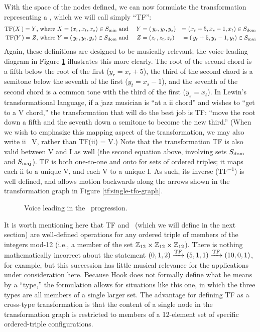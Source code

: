 With the space of the nodes defined, we can now formulate the transformation
representing a \tf, which we will call simply ``TF'':
%
{\novspace%
\begin{alignat*}{3}
    \mathrm{TF}(X\,) = Y\text{, where}\ X = (x_r, x_t, x_s) \in S_{\mathrm{min}}
    & \text{ and}\ &
    Y &= (\,y_r, y_t, y_s) &= (x_r + 5, x_s - 1, x_t) \in S_{\mathrm{dom}} \\
    \mathrm{TF}(Y\,) = Z\text{, where}\ Y = (\,y_r, y_t, y_s) \in S_{\mathrm{dom}}
    & \text{ and} &
    Z &= (z_r, z_t, z_s) &= (\,y_r + 5, y_s - 1, y_t) \in S_{\mathrm{maj}}
\end{alignat*}}%
%
Again, these definitions are designed to be musically relevant; the
voice-leading diagram in Figure \ref{tf:tfo-voice-leading} illustrates this
more clearly. The root of the second chord is a fifth below the root of the
first ($y_r = x_r + 5$), the third of the second chord is a semitone below the
seventh of the first ($y_t = x_s - 1$), and the seventh of the second chord is
a common tone with the third of the first ($y_s = x_t$). In Lewin's
transformational language, if a jazz musician is ``at a ii chord'' and
wishes to ``get to a V chord,'' the transformation that will do the
best job is TF: ``move the root down a fifth and the seventh down a semitone
to become the new third.'' (When we wish to emphasize this mapping
aspect of the transformation, we may also write ii
\TFarrow\ V, rather than TF(ii) = V.)
Note that the transformation TF is also valid
between V and I as well (the second equation above,
involving sets $S_{\mathrm{dom}}$ and $S_{\mathrm{maj}}$). TF is both one-to-one and onto for sets of
ordered triples; it maps each ii to a unique V, and each
V to a unique I. As such, its inverse ($\mathrm{TF}^{-1}$) is
well defined, and allows motion backwards along the arrows shown in the
transformation graph in Figure \ref{tf:single-tfo-graph}.

\begin{figure}[htbp]
  \caption{Voice leading in the \tfo\ progression.}
  \label{tf:tfo-voice-leading}
\end{figure}

It is worth mentioning here that TF and \tft\ (which we will define in the
next section) are well-defined operations for any ordered triple of members of
the integers mod-12 (i.e., a member of the set $\mathbb{Z}_{12} \times \mathbb{Z}_{12}
\times \mathbb{Z}_{12}$). There is nothing mathematically incorrect
about the statement $(0, 1, 2) \xrightarrow{\mathrm{TF}} (5, 1, 1) \xrightarrow{\mathrm{TF}} (10, 0, 1)$, for
example, but this succession has little musical relevance for the applications
under consideration here. Because Hook does not formally define what he means
by a ``type,'' the formulation allows for situations like this one, in which
the three types are all members of a single larger set. The advantage
for defining TF as a cross-type transformation is that the content of a single
node in the transformation graph is restricted to members of a 12-element set
of specific ordered-triple configurations.

